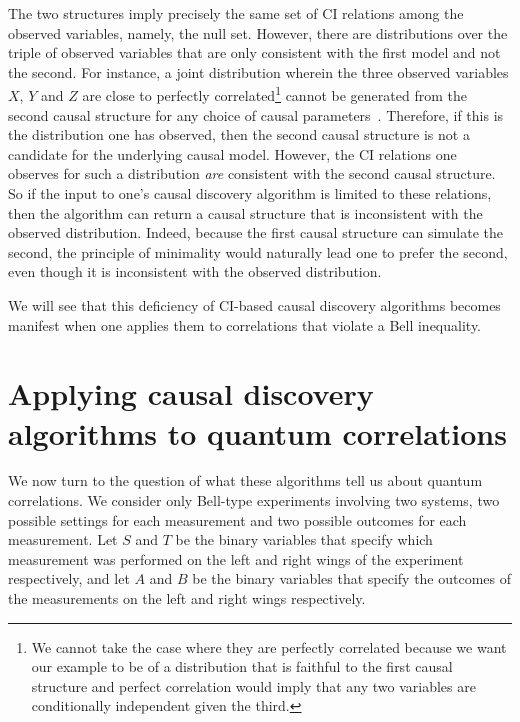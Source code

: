 \documentclass[letterpaper,onecolumn,nofootinbib]{revtex4}
\begin{document}
The two structures imply precisely the same set of CI relations among the observed variables, namely, the null set.
However, there are distributions over the triple of observed variables that are only consistent with the first model and not the second.  For instance, a joint distribution wherein the three observed variables $X$, $Y$ and $Z$ are close to perfectly correlated\footnote{We cannot take the case where they are perfectly correlated because we want our example to be of a distribution that is faithful to the first causal structure and perfect correlation would imply that any two variables are conditionally independent given the third.} cannot be generated from the second causal structure for any choice of causal parameters~\cite{SteudelAy,Fritz2012}.  Therefore, if this is the distribution one has observed, then the second causal structure is not a candidate for the underlying causal model.  However, the CI relations one observes for such a distribution \emph{are} consistent with the second causal structure.  
So if the input to one's causal discovery algorithm is limited to these relations, then the algorithm can return a causal structure that is inconsistent with the observed distribution. Indeed, because the first causal structure can simulate the second, the principle of minimality would naturally lead one to prefer the second, even though it is inconsistent with the observed distribution. 

We will see that this deficiency of CI-based causal discovery algorithms becomes manifest when one applies them to correlations that violate a Bell inequality.

\section{Applying causal discovery algorithms to quantum correlations}
\label{sec:qcor}

We now turn to the question of what these algorithms tell us about quantum correlations.
We consider only Bell-type experiments involving two systems, two possible settings for each measurement and two possible outcomes for each measurement.
Let $S$ and $T$ be the binary variables that specify which measurement was
performed on the left and right wings of the experiment respectively, and
let $A$ and $B$ be the binary variables that specify the outcomes of the
measurements on the left and right wings respectively.
\end{document}
